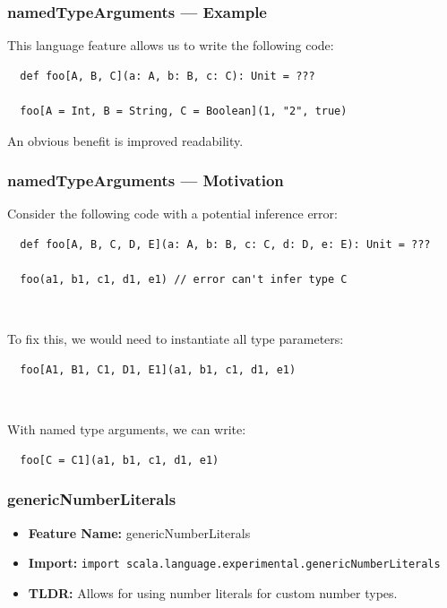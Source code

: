 \documentclass{beamer}
\begin{document}
\begin{frame}[fragile]
  \frametitle{namedTypeArguments --- Example}

  This language feature allows us to write the following code:
  \begin{lstlisting}
  def foo[A, B, C](a: A, b: B, c: C): Unit = ???

  foo[A = Int, B = String, C = Boolean](1, "2", true)
  \end{lstlisting}

  An obvious benefit is improved readability.

\end{frame}

\begin{frame}[fragile]
  \frametitle{namedTypeArguments --- Motivation}

  Consider the following code with a potential inference error:

  \begin{lstlisting}
  def foo[A, B, C, D, E](a: A, b: B, c: C, d: D, e: E): Unit = ???

  foo(a1, b1, c1, d1, e1) // error can't infer type C
  \end{lstlisting}

  \pause\

  To fix this, we would need to instantiate all type parameters:

  \begin{lstlisting}
  foo[A1, B1, C1, D1, E1](a1, b1, c1, d1, e1)
  \end{lstlisting}

  \pause\

  With named type arguments, we can write:

  \begin{lstlisting}
  foo[C = C1](a1, b1, c1, d1, e1)
  \end{lstlisting}
  
\end{frame}

\begin{frame}[fragile]
  \frametitle{genericNumberLiterals}
  \begin{itemize}
    \item \textbf{Feature Name:} genericNumberLiterals
    \item \textbf{Import:} \texttt{import scala.language.experimental.genericNumberLiterals}
    \item \textbf{TLDR:} Allows for using number literals for custom number types.
  \end{itemize}
\end{frame}
\end{document}
